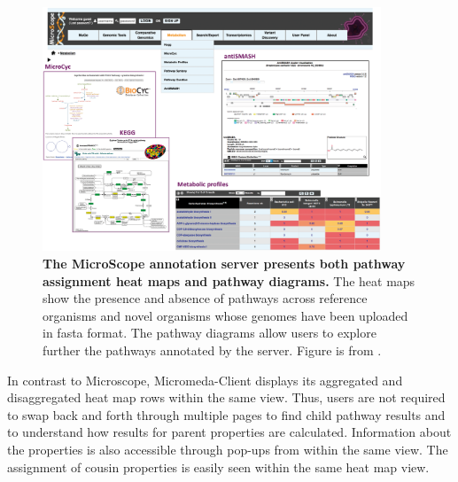 \begin{figure}[!ht]
  \centering
	\includegraphics[width=0.9\textwidth]{media/microscope.png}
	 \caption[The MicroScope annotation server presents both pathway assignment 
heat maps and pathway diagrams.]{\textbf{The MicroScope annotation server 
presents both pathway assignment heat maps and pathway diagrams.} The heat maps 
show the presence and absence of pathways across reference organisms and novel 
organisms whose genomes have been uploaded in \gls{fasta} format. The pathway diagrams 
allow users to explore further the pathways annotated by the server. Figure is 
from \cite{vallenet2016microscope}.}
	 \label{fig:microscope}
\end{figure}

In contrast to Microscope, Micromeda-Client displays its aggregated and 
disaggregated heat map rows within the same view. Thus, users are not required 
to swap back and forth through multiple pages to find child pathway results and 
to understand how results for parent properties are calculated. Information 
about the properties is also accessible through pop-ups from within the same 
view. The assignment of cousin properties is easily seen within the same heat 
map view.

